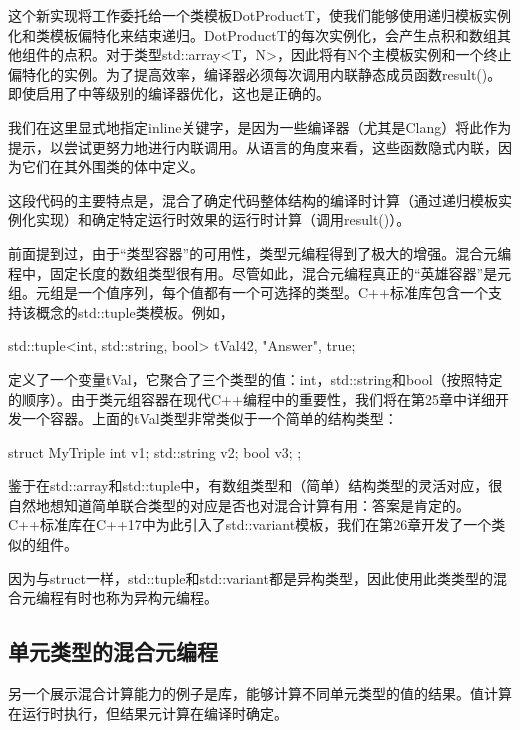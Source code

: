 这个新实现将工作委托给一个类模板DotProductT，使我们能够使用递归模板实例化和类模板偏特化来结束递归。DotProductT的每次实例化，会产生点积和数组其他组件的点积。对于类型std::array<T，N>，因此将有N个主模板实例和一个终止偏特化的实例。为了提高效率，编译器必须每次调用内联静态成员函数result()。即使启用了中等级别的编译器优化，这也是正确的。

\begin{notice}
我们在这里显式地指定inline关键字，是因为一些编译器（尤其是Clang）将此作为提示，以尝试更努力地进行内联调用。从语言的角度来看，这些函数隐式内联，因为它们在其外围类的体中定义。
\end{notice}

这段代码的主要特点是，混合了确定代码整体结构的编译时计算（通过递归模板实例化实现）和确定特定运行时效果的运行时计算（调用result()）。

前面提到过，由于“类型容器”的可用性，类型元编程得到了极大的增强。混合元编程中，固定长度的数组类型很有用。尽管如此，混合元编程真正的“英雄容器”是元组。元组是一个值序列，每个值都有一个可选择的类型。C++标准库包含一个支持该概念的std::tuple类模板。例如，

\begin{cpp}
std::tuple<int, std::string, bool> tVal{42, "Answer", true};
\end{cpp}

定义了一个变量tVal，它聚合了三个类型的值：int，std::string和bool（按照特定的顺序）。由于类元组容器在现代C++编程中的重要性，我们将在第25章中详细开发一个容器。上面的tVal类型非常类似于一个简单的结构类型：

\begin{cpp}
struct MyTriple {
	int v1;
	std::string v2;
	bool v3;
};
\end{cpp}

鉴于在std::array和std::tuple中，有数组类型和（简单）结构类型的灵活对应，很自然地想知道简单联合类型的对应是否也对混合计算有用：答案是肯定的。C++标准库在C++17中为此引入了std::variant模板，我们在第26章开发了一个类似的组件。

因为与struct一样，std::tuple和std::variant都是异构类型，因此使用此类类型的混合元编程有时也称为异构元编程。

\subsection{单元类型的混合元编程}

另一个展示混合计算能力的例子是库，能够计算不同单元类型的值的结果。值计算在运行时执行，但结果元计算在编译时确定。

